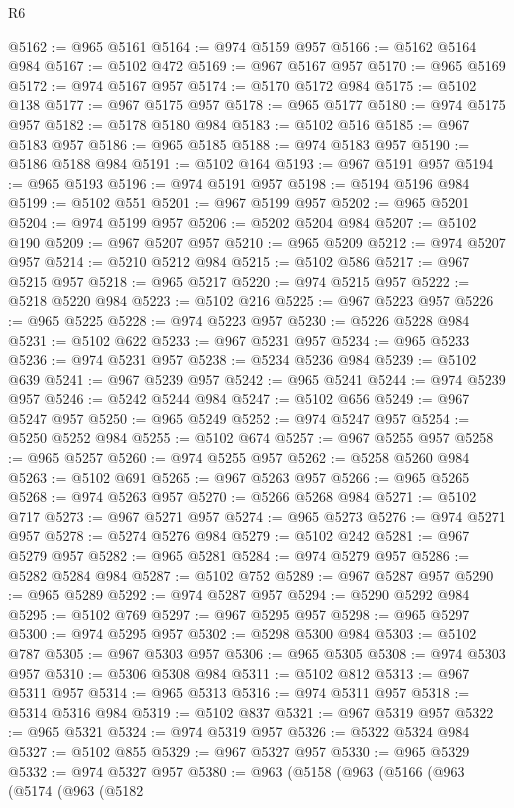 \begin{lexlean}{R6}
\begin{coremodule}
@5162 := @965 @5161
@5164 := @974 @5159 @957
@5166 := @5162 @5164 @984
@5167 := @5102 @472
@5169 := @967 @5167 @957
@5170 := @965 @5169
@5172 := @974 @5167 @957
@5174 := @5170 @5172 @984
@5175 := @5102 @138
@5177 := @967 @5175 @957
@5178 := @965 @5177
@5180 := @974 @5175 @957
@5182 := @5178 @5180 @984
@5183 := @5102 @516
@5185 := @967 @5183 @957
@5186 := @965 @5185
@5188 := @974 @5183 @957
@5190 := @5186 @5188 @984
@5191 := @5102 @164
@5193 := @967 @5191 @957
@5194 := @965 @5193
@5196 := @974 @5191 @957
@5198 := @5194 @5196 @984
@5199 := @5102 @551
@5201 := @967 @5199 @957
@5202 := @965 @5201
@5204 := @974 @5199 @957
@5206 := @5202 @5204 @984
@5207 := @5102 @190
@5209 := @967 @5207 @957
@5210 := @965 @5209
@5212 := @974 @5207 @957
@5214 := @5210 @5212 @984
@5215 := @5102 @586
@5217 := @967 @5215 @957
@5218 := @965 @5217
@5220 := @974 @5215 @957
@5222 := @5218 @5220 @984
@5223 := @5102 @216
@5225 := @967 @5223 @957
@5226 := @965 @5225
@5228 := @974 @5223 @957
@5230 := @5226 @5228 @984
@5231 := @5102 @622
@5233 := @967 @5231 @957
@5234 := @965 @5233
@5236 := @974 @5231 @957
@5238 := @5234 @5236 @984
@5239 := @5102 @639
@5241 := @967 @5239 @957
@5242 := @965 @5241
@5244 := @974 @5239 @957
@5246 := @5242 @5244 @984
@5247 := @5102 @656
@5249 := @967 @5247 @957
@5250 := @965 @5249
@5252 := @974 @5247 @957
@5254 := @5250 @5252 @984
@5255 := @5102 @674
@5257 := @967 @5255 @957
@5258 := @965 @5257
@5260 := @974 @5255 @957
@5262 := @5258 @5260 @984
@5263 := @5102 @691
@5265 := @967 @5263 @957
@5266 := @965 @5265
@5268 := @974 @5263 @957
@5270 := @5266 @5268 @984
@5271 := @5102 @717
@5273 := @967 @5271 @957
@5274 := @965 @5273
@5276 := @974 @5271 @957
@5278 := @5274 @5276 @984
@5279 := @5102 @242
@5281 := @967 @5279 @957
@5282 := @965 @5281
@5284 := @974 @5279 @957
@5286 := @5282 @5284 @984
@5287 := @5102 @752
@5289 := @967 @5287 @957
@5290 := @965 @5289
@5292 := @974 @5287 @957
@5294 := @5290 @5292 @984
@5295 := @5102 @769
@5297 := @967 @5295 @957
@5298 := @965 @5297
@5300 := @974 @5295 @957
@5302 := @5298 @5300 @984
@5303 := @5102 @787
@5305 := @967 @5303 @957
@5306 := @965 @5305
@5308 := @974 @5303 @957
@5310 := @5306 @5308 @984
@5311 := @5102 @812
@5313 := @967 @5311 @957
@5314 := @965 @5313
@5316 := @974 @5311 @957
@5318 := @5314 @5316 @984
@5319 := @5102 @837
@5321 := @967 @5319 @957
@5322 := @965 @5321
@5324 := @974 @5319 @957
@5326 := @5322 @5324 @984
@5327 := @5102 @855
@5329 := @967 @5327 @957
@5330 := @965 @5329
@5332 := @974 @5327 @957
@5380 := @963
    (@5158
      (@963
        (@5166
          (@963
            (@5174
              (@963
                (@5182

\end{coremodule}
\end{lexlean}
